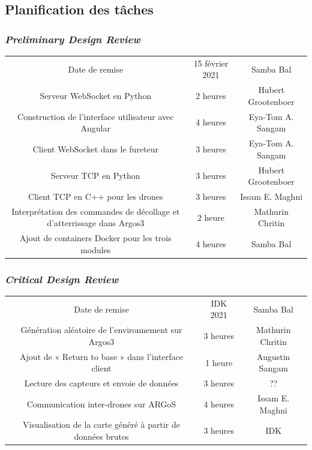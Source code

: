 \documentclass{mistcoursedoc}
\begin{document}
\subsection{Planification des tâches}

\subsubsection{\emph{Preliminary Design Review}}

\begin{center}
  \begin{tabular}{ c c c }
    Date de remise & 15 février 2021 & Samba Bal \\
    
    Serveur WebSocket en Python & 2 heures & Hubert Grootenboer \\
    Construction de l’interface utilisateur avec Angular & 4 heures & Eya-Tom A. Sangam \\
    Client WebSocket dans le fureteur & 3 heures & Eya-Tom A. Sangam \\
    Serveur TCP en Python & 3 heures & Hubert Grootenboer \\
    Client TCP en C++ pour les drones & 3 heures & Issam E. Maghni \\
    Interprétation des commandes de décollage et d’atterrissage dans Argos3 & 2 heure & Mathurin Chritin \\
    Ajout de containers Docker pour les trois modules & 4 heures & Samba Bal
  \end{tabular}
\end{center}

\subsubsection{\emph{Critical Design Review}}

\begin{center}
  \begin{tabular}{ c c c }
    Date de remise & IDK 2021 & Samba Bal \\
    
    Génération aléatoire de l’environnement sur Argos3 & 3 heures & Mathurin Chritin \\
    Ajout de « Return to base » dans l’interface client & 1 heure & Augustin Sangam \\
    Lecture des capteurs et envoie de données & 3 heures & ?? \\
    Communication inter-drones sur ARGoS & 4 heures & Issam E. Maghni \\
    Visualisation de la carte généré à partir de données brutes & 3 heures & IDK \\
  \end{tabular}
\end{center}
\end{document}
